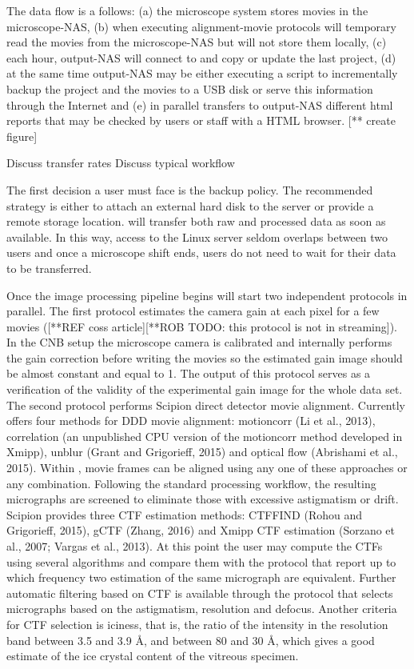 The data flow is a follows: (a) the microscope system stores movies in the microscope-NAS, (b) when executing alignment-movie protocols \scipionbox will temporary read the movies from 
the microscope-NAS but will not store them locally, (c) each hour, output-NAS will connect to \scipionbox and copy or update the last \scipion project, (d) at the same time output-NAS may be either executing a script to incrementally backup the \scipion project and the movies to a USB disk or serve this information through the Internet and (e) in parallel \scipionbox transfers to  output-NAS different html reports that may be checked by users or staff with a HTML browser.
[** create figure]

Discuss transfer rates
Discuss typical workflow

The first decision a user must face is the backup policy. The recommended strategy is either to attach an external hard disk to the server or provide a remote storage location. \scipionbox will transfer both raw and processed data as soon as available. In this way, access to the Linux server seldom overlaps between two users and once a microscope shift ends, users do not need to wait for their data to be transferred. 

Once the image processing pipeline begins \scipionbox will start two independent protocols in parallel. The first protocol estimates the camera gain at each pixel for a few  movies ([**REF coss article][**ROB TODO: this protocol is not in streaming]). In the CNB setup the microscope camera is calibrated and internally performs the gain correction before writing the movies so the estimated gain image should be almost constant and equal to 1. The output of this protocol serves as a verification of the validity of the experimental gain image for the whole data set. The second protocol performs Scipion direct detector movie alignment. Currently \scipionbox offers  four  methods  for  DDD  movie  alignment: motioncorr (Li et al., 2013),
correlation (an unpublished CPU version of the motioncorr method developed in Xmipp),
unblur (Grant and Grigorieff, 2015) and optical flow (Abrishami et al., 2015). Within \scipionbox, movie frames can be aligned using any one of these approaches or any combination. Following the standard processing workflow, the resulting micrographs are screened to eliminate those with excessive astigmatism or drift. Scipion provides three CTF estimation methods:
CTFFIND (Rohou and Grigorieff, 2015), gCTF (Zhang, 2016) and Xmipp CTF estimation (Sorzano et al., 2007; Vargas et al., 2013). At this point the user may compute the CTFs using several algorithms and compare them with the protocol  that report up to which frequency two estimation of the same micrograph are equivalent. Further automatic filtering based on CTF is available through the protocol  that selects micrographs based on the astigmatism, resolution and defocus. Another criteria for CTF selection is iciness, that is,  the ratio of the intensity in the resolution band between 3.5 and 3.9 \AA, and between 80 and 30 \AA, which gives a good estimate of the ice crystal content of the vitreous specimen.

